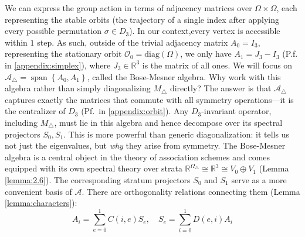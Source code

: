 \documentclass{article}
\theoremstyle{plain}
\numberwithin{equation}{section}
\theoremstyle{definition}
\theoremstyle{remark}
\begin{document}
We can express the group action in terms of adjacency matrices over $\Omega\times \Omega$, each representing the stable orbits (the trajectory of a single index after applying every possible permutation $\sigma\in D_3$). In our context,every vertex is accessible within $1$ step. As such, outside of the trivial adjacency matrix $A_0 =I_3$, representing the stationary orbit $\mathcal{O}_0 = \text{diag}(\Omega)$, we only have $A_1 = J_3-I_3$ (P.f. in \ref{appendix:simplex}), where $J_3\in \mathbb{R}^3$ is the matrix of all ones. We will focus on $\mathcal{A}_\triangle= \operatorname{span}\left\{A_0, A_1\right\}$, called the Bose-Mesner algebra. Why work with this algebra rather than simply diagonalizing $M_\triangle$ directly? The answer is that $\mathcal{A}_\triangle$ captures exactly the matrices that commute with all symmetry operations---it is the centralizer of $D_3$ (Pf.\ in \ref{appendix:orbit}). Any $D_3$-invariant operator, including $M_\triangle$, must lie in this algebra and hence decompose over its spectral projectors $S_0, S_1$. This is more powerful than generic diagonalization: it tells us not just the eigenvalues, but \textit{why} they arise from symmetry. The Bose-Mesner algebra is a central object in the theory of association schemes \cite{rabailey} and comes equipped with its own spectral theory over strata $\mathbb{R}^{\Omega_\triangle} \cong \mathbb{R}^3 \cong V_0 \oplus V_1$ (Lemma \ref{lemma:2.6}).
The corresponding stratum projectors $S_0$ and $S_1$ serve as a more convenient basis of $\mathcal{A}$. There are orthogonality relations connecting them (Lemma \ref{lemma:characters}): 
\vspace{-0.2cm}
\begin{equation}A_i = \sum_{e=0}^1 C(i, e) S_e, \quad S_e = \sum_{i=0}^1 D(e, i)A_i\end{equation}\vspace{-0.2cm}
\end{document}
